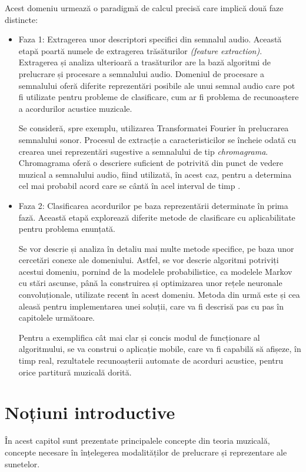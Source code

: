 \documentclass[a4paper,12pt]{report}
\begin{document}
Acest domeniu urmează o paradigmă de calcul precisă care implică două faze distincte:
\begin{itemize}
    \item Faza 1: Extragerea unor descriptori specifici din semnalul audio. Această 
etapă poartă numele de extragerea trăsăturilor  \emph{(feature extraction)}. Extragerea și analiza
ulterioară a trasăturilor are la bază algoritmi de prelucrare și procesare a semnalului audio.
Domeniul de procesare a semnalului oferă diferite reprezentări posibile ale unui semnal audio care
pot fi utilizate pentru probleme de clasificare, cum ar fi problema de recunoaștere 
a acordurilor acustice muzicale. 

Se consideră, spre exemplu, utilizarea
Transformatei Fourier în prelucrarea semnalului sonor. Procesul de extracție a caracteristicilor se
încheie odată cu crearea unei reprezentări sugestive a semnalului de tip \emph{chromagrama}.
Chromagrama oferă o descriere suficient de potrivită din punct de vedere muzical a semnalului audio,
fiind utilizată, în acest caz, pentru a determina cel mai probabil acord care se cântă în acel interval
de timp \cite{Harmonic-content-in-music-signals}.

    \item Faza 2: Clasificarea acordurilor pe baza reprezentării determinate în prima fază. 
Această etapă explorează diferite metode de clasificare cu aplicabilitate pentru problema 
enunțată.

Se vor descrie și analiza în detaliu mai multe metode specifice, pe baza unor 
cercetări conexe ale domeniului. Astfel, se vor descrie algoritmi potriviți acestui domeniu,
pornind de la modelele probabilistice, ca modelele Markov cu stări ascunse, 
până la construirea și optimizarea unor rețele neuronale convoluționale, 
utilizate recent în acest domeniu. Metoda din urmă este și cea aleasă pentru implementarea 
unei soluții, care va fi descrisă pas cu pas în capitolele următoare. 

Pentru a exemplifica cât mai clar și concis modul de funcționare al algoritmului, se va construi 
o aplicație mobile, care va fi capabilă să afișeze, în timp real, rezultatele recunoașterii automate 
de acorduri acustice, pentru orice partitură muzicală dorită.

\end{itemize}

\chapter{Noțiuni introductive}
În acest capitol sunt prezentate principalele concepte din teoria muzicală, 
concepte necesare în înțelegerea modalităților de prelucrare și reprezentare ale sunetelor.
\end{document}
